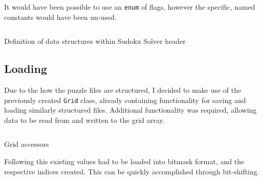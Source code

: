             It would have been possible to use an \texttt{enum} of flags,
            however the specific, named constants would have been un-used.

        \begin{listing}[!h]
            \inputminted[gobble=4, firstline=25, lastline=31]{cpp}{../Sudoku/SudokuPuzzle.h}
            \caption{Definition of data structures within Sudoku Solver header}
        \end{listing}

    \subsection*{Loading}
        Due to the how the puzzle files are structured,
        I decided to make use of the previously created \texttt{Grid}
        class, already containing functionality for saving and loading similarly structured files.
        Additional functionality was required, allowing data to be read from and written to
        the grid array.

        \begin{listing}[!h]
            \inputminted[firstline=92]{cpp}{../Sudoku/Grid.cpp}
            \caption{Grid accessors}
        \end{listing}

        Following this existing values had to be loaded into bitmask format,
        and the respective indices created. 
        This can be quickly accomplished through bit-shifting.

